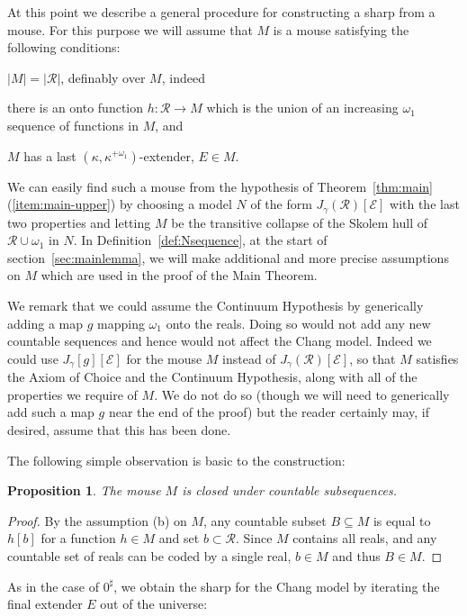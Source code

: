 \documentclass[
twoside,
]{article}
\newenvironment{myinparaenum}{\begin{inparaenum}[\upshape(i)]
}{\end{inparaenum}}
\newtheorem{proposition}[theorem]{Proposition}
\theoremstyle{definition}
\theoremstyle{remark}
\newcommand\reals{\mathcal{R}}
\newcommand{\card}[1]{|#1|}
\begin{document}
At this point we describe a general procedure for constructing a  sharp from a mouse. 
For this purpose we will assume that $M$ is a mouse satisfying the
following conditions: 
\begin{myinparaenum}
\item $\card M=\card\reals$, definably over $M$, indeed
\item
  there is an onto function $h\colon \reals\to M$ which is the
  union of an increasing $\omega_1$ sequence of functions in  $M$, and 
\item $M$ has a last $(\kappa,\kappa^{+\omega_1})$-extender, $E\in M$.
\end{myinparaenum}
We can easily find such a mouse from the hypothesis of
Theorem~\ref{thm:main}(\ref{item:main-upper}) by choosing a model $N$ of
the form   $J_{\gamma}(\reals)[\mathcal{E}]$ with the last two properties and
letting $M$ be  the transitive collapse of the  Skolem hull of
$\reals\cup\omega_1$ in $N$.
In Definition~\ref{def:Nsequence},  at the start of
section~\ref{sec:mainlemma}, 
we will make additional and
more precise  assumptions on $M$ which are used in the proof of the
Main Theorem.

We remark that we could assume the Continuum Hypothesis by 
generically adding a map $g$ mapping $\omega_1$ onto the reals.
Doing so would not add any new countable sequences and hence would not
affect the Chang model.   Indeed we could use
$J_{\gamma}[g][\mathcal{E}]$ for the mouse $M$ instead of
$J_{\gamma}(\reals)[\mathcal{E}]$, so that $M$ satisfies the Axiom of
Choice and the Continuum Hypothesis, along with all of the properties we require of $M$.
We do not do so (though we will need to generically add such a
map $g$ near the end of the proof) but the reader certainly may, if
desired, assume that this has been done.



The following simple observation is basic to the construction:
\begin{proposition}\label{thm:Mcc}
  The mouse $M$ is closed
  under countable subsequences.
\end{proposition}
\begin{proof}
  By the assumption (b) on $M$, any countable subset $B\subseteq M$ is
  equal to $h[b]$ for a function $h\in M$ and set $b\subset\reals$.
  Since $M$ contains all reals, and
  any countable set of reals can be coded by a single real, $b\in M$
  and thus $B\in M$.
\end{proof}

As in the case of $0^{\sharp}$, we obtain the sharp for the Chang model by iterating the final extender $E$ out of the universe:
\end{document}

